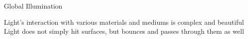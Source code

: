 \documentclass[10pt,compress,professionalfont]{beamer}
\begin{document}
\begin{frame}{Global Illumination}

    Light's interaction with various materials and mediums is complex and beautiful\\
    \vspace{6mm}
    Light does not simply hit surfaces, but bounces and passes through them as well\\
    \vspace{4mm}


\end{frame}
\end{document}
